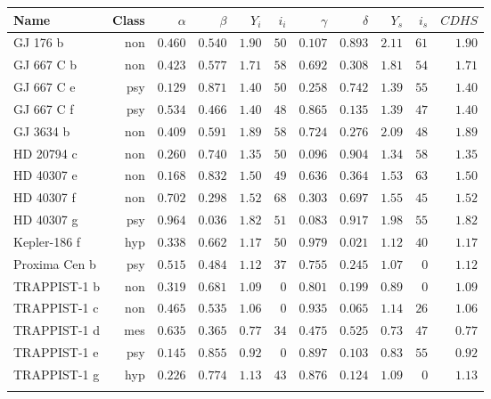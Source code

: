 \begin{tabular}{l r r r r r r r r r r}
  \toprule
  Name & Class & $\alpha$ & $\beta$ & $Y_i$ & $i_i$ & $\gamma$ & $\delta$ & $Y_s$ & $i_s$ & $\mathit{CDHS}$\\
  \midrule
  GJ 176 b & non & $0.460$ & $0.540$ & $1.90$ & $50$ & $0.107$ & $0.893$ & $2.11$ & $61$ & $1.90$\\
  GJ 667 C b & non & $0.423$ & $0.577$ & $1.71$ & $58$ & $0.692$ & $0.308$ & $1.81$ & $54$ & $1.71$\\
  GJ 667 C e & psy & $0.129$ & $0.871$ & $1.40$ & $50$ & $0.258$ & $0.742$ & $1.39$ & $55$ & $1.40$\\
  GJ 667 C f & psy & $0.534$ & $0.466$ & $1.40$ & $48$ & $0.865$ & $0.135$ & $1.39$ & $47$ & $1.40$\\
  GJ 3634 b & non & $0.409$ & $0.591$ & $1.89$ & $58$ & $0.724$ & $0.276$ & $2.09$ & $48$ & $1.89$\\
  HD 20794 c & non & $0.260$ & $0.740$ & $1.35$ & $50$ & $0.096$ & $0.904$ & $1.34$ & $58$ & $1.35$\\
  HD 40307 e & non & $0.168$ & $0.832$ & $1.50$ & $49$ & $0.636$ & $0.364$ & $1.53$ & $63$ & $1.50$\\
  HD 40307 f & non & $0.702$ & $0.298$ & $1.52$ & $68$ & $0.303$ & $0.697$ & $1.55$ & $45$ & $1.52$\\
  HD 40307 g & psy & $0.964$ & $0.036$ & $1.82$ & $51$ & $0.083$ & $0.917$ & $1.98$ & $55$ & $1.82$\\
  Kepler-186 f & hyp & $0.338$ & $0.662$ & $1.17$ & $50$ & $0.979$ & $0.021$ & $1.12$ & $40$ & $1.17$\\
  Proxima Cen b & psy & $0.515$ & $0.484$ & $1.12$ & $37$ & $0.755$ & $0.245$ & $1.07$ & $ 0$ & $1.12$\\
  TRAPPIST-1 b & non & $0.319$ & $0.681$ & $1.09$ & $ 0$ & $0.801$ & $0.199$ & $0.89$ & $ 0$ & $1.09$\\
  TRAPPIST-1 c & non & $0.465$ & $0.535$ & $1.06$ & $ 0$ & $0.935$ & $0.065$ & $1.14$ & $26$ & $1.06$\\
  TRAPPIST-1 d & mes & $0.635$ & $0.365$ & $0.77$ & $34$ & $0.475$ & $0.525$ & $0.73$ & $47$ & $0.77$\\
  TRAPPIST-1 e & psy & $0.145$ & $0.855$ & $0.92$ & $ 0$ & $0.897$ & $0.103$ & $0.83$ & $55$ & $0.92$\\
  TRAPPIST-1 g & hyp & $0.226$ & $0.774$ & $1.13$ & $43$ & $0.876$ & $0.124$ & $1.09$ & $ 0$ & $1.13$\\
  \bottomrule\\
\end{tabular}
